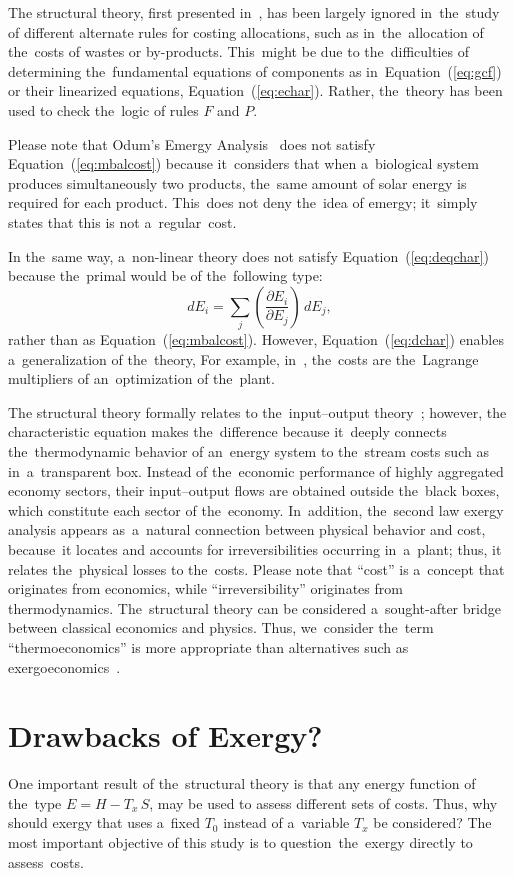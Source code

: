 \documentclass[energies,article,accept,moreauthors,pdftex]{Definitions/mdpi}
\newcommand{\dpartial}[2]{\left(\dfrac{\partial E_{#1}}{\partial E_{#2}}\right)}
\begin{document}
The structural theory, first presented in~\cite{Valero1992a,Valero1993}, has been largely ignored in~the~study of different alternate rules for costing allocations, such as in~the~allocation of the~costs of wastes or by-products. This~might be due to the~difficulties of determining the~fundamental equations of components as in~Equation~(\ref{eq:gcf}) or their linearized equations, Equation~(\ref{eq:echar}). Rather, the~theory has been used to check the~logic of rules $F$ and $P$.

Please note that Odum's Emergy Analysis~\cite{Odum1988,Brown1996} does not satisfy Equation~(\ref{eq:mbalcost}) because it~considers that when a~biological system produces simultaneously two products, the~same amount of solar energy is required for each product. This~does not deny the~idea of emergy; it~simply states that this is not a~regular~cost.

In the~same way, a~non-linear theory does not satisfy Equation~(\ref{eq:deqchar}) because the~primal would be of the~following type:
\begin{equation}
dE_i=\sum_j \dpartial{i}{j}\, dE_j,
\label{eq:dchar}
\end{equation}
rather than as Equation~(\ref{eq:mbalcost}). However, Equation~(\ref{eq:dchar}) enables a~generalization of the~theory, For example, in~\cite{Valero1993}, the~costs are the~Lagrange multipliers of an~optimization of the~plant.

The structural theory formally relates to the~input–output theory~\cite{Leontief1970}; however, the characteristic equation makes the~difference because it~deeply connects the~thermodynamic behavior of an~energy system to the~stream costs such as in~a~transparent box. Instead of the~economic performance of highly aggregated economy sectors, their input–output flows are obtained outside the~black boxes, which constitute each sector of the~economy. In~addition, the~second law exergy analysis appears as~a~natural connection between physical behavior and cost, because~it locates and accounts for irreversibilities occurring in~a~plant; thus, it relates the~physical losses to the~costs. Please note that “cost” is a~concept that originates from economics, while “irreversibility” originates from thermodynamics. The~structural theory can be considered a~sought-after bridge between classical economics and physics. Thus, we~consider the~term “thermoeconomics” is more appropriate than alternatives such as exergoeconomics~\cite{Tsatsaronis2007}.


\section{Drawbacks of Exergy?}
One important result of the~structural theory is that any energy function of the~type ${E=H-T_x\,S}$, may be used to assess different sets of costs. Thus, why should exergy that uses a~fixed $T_0$ instead of a~variable $T_x$ be considered? The most important objective of this study is to question~the~exergy directly to assess~costs.
\end{document}
